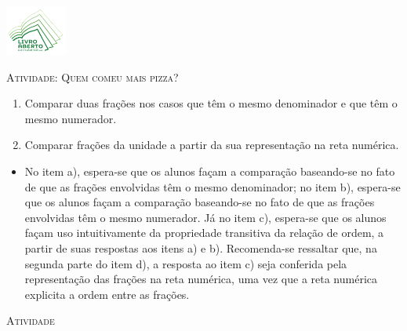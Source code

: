 \documentclass[10 pt,usenames,dvipsnames, oneside]{article}
\begin{document}
\begin{center}
  \begin{minipage}[l]{3cm}
\includegraphics[width=2cm]{../../../Figuras/logo}       
\end{minipage}\hfill
\begin{minipage}[r]{.8\textwidth}
 {\Large \scshape Atividade: Quem comeu mais pizza?}  
\end{minipage}
\end{center}
\vspace{.2cm}

\ifdefined\prof
\begin{goals}
\begin{enumerate}
\item Comparar  duas frações nos casos  que têm o mesmo denominador e que têm o mesmo numerador.
\item Comparar frações da unidade a partir da sua representação na reta numérica.
\end{enumerate}

\tcblower

\begin{itemize}
\item       No item a), espera-se que os alunos façam a comparação baseando-se no fato de que as frações envolvidas têm o mesmo denominador; no item b), espera-se que os alunos façam a comparação baseando-se no fato de que as frações envolvidas têm o mesmo numerador. Já no item c), espera-se que os alunos façam uso intuitivamente da propriedade transitiva da relação de ordem, a partir de suas respostas aos itens a) e b). Recomenda-se ressaltar que, na segunda parte do item d), a resposta ao item c) seja conferida pela representação das frações na reta numérica, uma vez que a reta numérica explicita a ordem entre as frações.
\end{itemize}
\end{goals}

\bigskip
\begin{center}
{\large \scshape Atividade}
\end{center}
\fi
\end{document}
